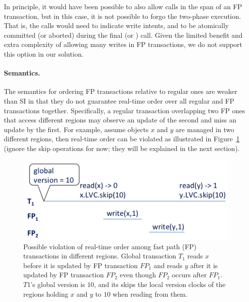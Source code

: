{In principle, it would have been possible to also allow  calls in the span of an FP transaction, 
but in this case, it is not possible to forgo the two-phase execution. 
That is, the  calls would need to indicate write intents, and  to be atomically committed (or aborted) during the final  
(or ) call. 
Given the limited benefit and extra complexity of allowing many writes in FP transactions, we do not support this option in our solution.

}

\paragraph{Semantics.}

The semantics for ordering FP transactions relative to regular ones are
weaker than SI in that they do not guarantee real-time order over all regular
and FP transactions together. Specifically, a regular transaction overlapping
two FP ones that access different regions may observe an update of
the second and miss an update by the first. For example, assume objects $x$ and $y$
are managed in two different regions, then real-time order can be violated as
illustrated in Figure~\ref{fig:ltx-rt} (ignore the skip operations for now; they will be explained in the next section).

\begin{figure}[h]
\includegraphics[width=\columnwidth]{figs/LTX-RT}
\caption{Possible violation of real-time order among fast path (FP) transactions in different regions. Global transaction $T_1$
reads $x$ before it is updated by FP transaction $FP_1$ and reads $y$ after it is updated by FP transaction $FP_2$ even 
though $FP_2$ occurs after $FP_1$. $T1$'s global version is $10$, and its skips the local version clocks of the regions holding $x$ and $y$ to $10$ when reading from them.}
\label{fig:ltx-rt}
\end{figure}

